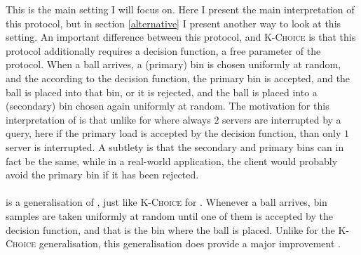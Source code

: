 This is the main setting I will focus on. Here I present the main interpretation of this protocol, but in section \ref{alternative} I present another way to look at this setting. An important difference between this protocol, and \textsc{K-Choice} is that this protocol additionally requires a decision function, a free parameter of the protocol. When a ball arrives, a (primary) bin is chosen uniformly at random, and the according to the decision function, the primary bin is accepted, and the ball is placed into that bin, or it is rejected, and the ball is placed into a (secondary) bin chosen again uniformly at random. The motivation for this interpretation of \TwoThinning is that unlike for \TwoThinning{} where always $2$ servers are interrupted by a query, here if the primary load is accepted by the decision function, than only $1$ server is interrupted. A subtlety is that the secondary and primary bins can in fact be the same, while in a real-world application, the client would probably avoid the primary bin if it has been rejected.

\paragraph{\KThinning}

\KThinning is a generalisation of \TwoThinning, just like \textsc{K-Choice} for \TwoChoice. Whenever a ball arrives,  bin samples are taken uniformly at random until one of them is accepted by the decision function, and that is the bin where the ball is placed. Unlike for the \textsc{K-Choice} generalisation, this generalisation does provide a major improvement \cite{feldheim2020dthinning}.


\paragraph{\GraphicalTwoChoice}

